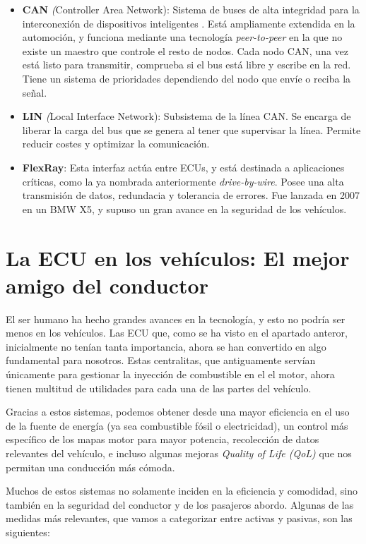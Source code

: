 \begin{itemize}
    \item \textbf{CAN} \textit({Controller Area Network}): Sistema de buses de alta integridad para la interconexión de dispositivos inteligentes \cite{can}.  Está ampliamente extendida en la automoción, y funciona mediante una tecnología \textit{peer-to-peer} en la que no existe un maestro que controle el resto de nodos. Cada nodo CAN, una vez está listo para transmitir, comprueba si el bus está libre y escribe en la red. Tiene un sistema de prioridades dependiendo del nodo que envíe o reciba la señal. 
    \item \textbf{LIN} \textit({Local Interface Network}): Subsistema de la línea CAN. Se encarga de liberar la carga del bus que se genera al tener que supervisar la línea. Permite reducir costes y optimizar la comunicación.
    \item \textbf{FlexRay}: Esta interfaz actúa entre ECUs, y está destinada a aplicaciones críticas, como la ya nombrada anteriormente \textit{drive-by-wire}. Posee una alta transmisión de datos, redundacia y tolerancia de errores. Fue lanzada en 2007 en un BMW X5, y supuso un gran avance en la seguridad de los vehículos.
\end{itemize}

\section{La ECU en los vehículos: El mejor amigo del conductor}

El ser humano ha hecho grandes avances en la tecnología, y esto no podría ser menos en los vehículos. Las ECU que, como se ha visto en el apartado anteror, inicialmente no tenían tanta importancia, ahora se han convertido en algo fundamental para nosotros. Estas centralitas, que antiguamente servían únicamente para gestionar la inyección de combustible en el el motor, ahora tienen multitud de utilidades para cada una de las partes del vehículo.

Gracias a estos sistemas, podemos obtener desde una mayor eficiencia en el uso de la fuente de energía (ya sea combustible fósil o electricidad), un control más específico de los mapas motor para mayor potencia, recolección de datos relevantes del vehículo, e incluso algunas mejoras \textit{Quality of Life (QoL)} que nos permitan una conducción más cómoda. 

Muchos de estos sistemas no solamente inciden en la eficiencia y comodidad, sino también en la seguridad del conductor y de los pasajeros abordo. Algunas de las medidas más relevantes, que vamos a categorizar entre activas y pasivas, son las siguientes\cite{safety_systems}:

